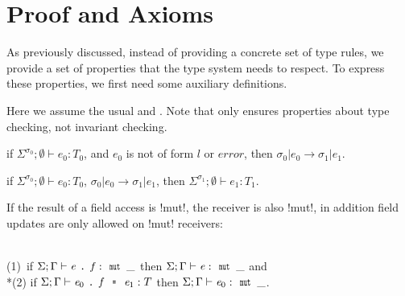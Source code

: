 \section{Proof and Axioms}
\label{s:proof}

As previously discussed, instead of providing a concrete set of type rules, we provide a set of properties
that the type system needs to respect.
To express these properties, we first need some auxiliary definitions.



Here we assume the usual  and . Note that  only ensures properties about type checking, not invariant checking.
\begin{Assumption}[Progress]\rm
	if $\Sigma^{\sigma_0};\emptyset\vdash e_0: T_0$,
	and $e_0$ is not of form $l$ or $\mathit{error}$, then
	$\sigma_0|e_0\rightarrow \sigma_1|e_1$.
\end{Assumption}

\begin{Assumption}\rm
	if $\Sigma^{\sigma_0};\emptyset\vdash e_0: T_0$,
	$\sigma_0|e_0\rightarrow \sigma_1|e_1$,
	then
	$\Sigma^{\sigma_1};\emptyset\vdash e_1: T_1$.
\end{Assumption}


If the result of a field access is \Q!mut!,
the receiver is also \Q!mut!, in addition field updates are only allowed on \Q!mut! receivers:
\begin{Assumption}\rm
	\ \\
	\indent(1)\ if $\Sigma;\Gamma\vdash\e\singleDot\f:\Kw{mut}\,\_$
	then $\Sigma;\Gamma\vdash\e:\Kw{mut}\,\_$
	and 
	\\*\indent(2)
	if $\Sigma;\Gamma\vdash\e_0\singleDot\f\equals\e_1:T$
	then $\Sigma;\Gamma\vdash\e_0:\Kw{mut}\,\_$.
\end{Assumption}%


